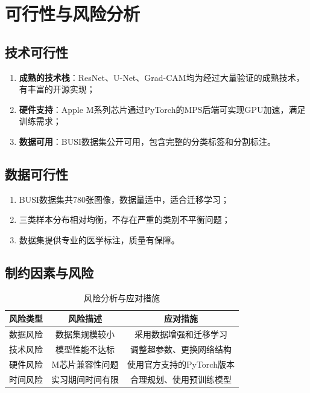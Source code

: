 \documentclass[supercite]{Hust-undergraduate-kaiti}
\theoremstyle{definition}
\begin{document}
\section{可行性与风险分析}

\subsection{技术可行性}

\begin{enumerate}
    \item \textbf{成熟的技术栈}：ResNet、U-Net、Grad-CAM均为经过大量验证的成熟技术，有丰富的开源实现；
    \item \textbf{硬件支持}：Apple M系列芯片通过PyTorch的MPS后端可实现GPU加速，满足训练需求；
    \item \textbf{数据可用}：BUSI数据集公开可用，包含完整的分类标签和分割标注。
\end{enumerate}

\subsection{数据可行性}

\begin{enumerate}
    \item BUSI数据集共780张图像，数据量适中，适合迁移学习；
    \item 三类样本分布相对均衡，不存在严重的类别不平衡问题；
    \item 数据集提供专业的医学标注，质量有保障。
\end{enumerate}

\subsection{制约因素与风险}

\begin{table}[htb]
\centering
\caption{风险分析与应对措施}
\begin{tabular}{|c|c|c|}
\hline
\textbf{风险类型} & \textbf{风险描述} & \textbf{应对措施} \\ \hline
数据风险 & 数据集规模较小 & 采用数据增强和迁移学习 \\ \hline
技术风险 & 模型性能不达标 & 调整超参数、更换网络结构 \\ \hline
硬件风险 & M芯片兼容性问题 & 使用官方支持的PyTorch版本 \\ \hline
时间风险 & 实习期间时间有限 & 合理规划、使用预训练模型 \\ \hline
\end{tabular}
\end{table}
\end{document}
